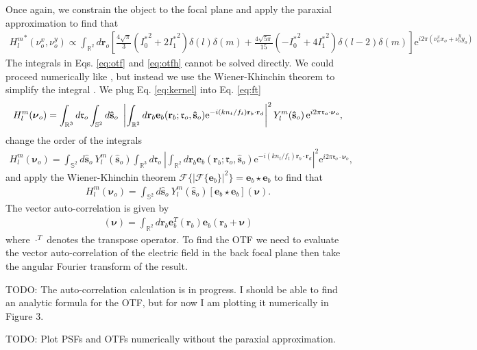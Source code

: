 \documentclass[11pt]{article}
\newcommand{\me}{\mathrm{e}}
\providecommand{\mb}[1]{\mathbf{#1}}
\providecommand{\ro}[1]{\mathbf{\mathfrak{r}}_o}
\providecommand{\so}[1]{\mathbf{\hat{s}}_o}
\providecommand{\rb}[1]{\mathbf{r}_b}
\providecommand{\rd}[1]{\mathbf{r}_d}
\providecommand{\bs}[1]{\boldsymbol{#1}}
\begin{document}
Once again, we constrain the object to the focal plane and apply the paraxial
approximation to find that
\begin{align}
  {H_l^m}^*(\nu_o^x, \nu_o^y) \propto \int_{\mathbb{R}^2}d\mb{r}_o\left[\frac{4\sqrt{\pi}}{3}({I_0^*}^2 + 2{I_1^*}^2)\delta(l)\delta(m) + \frac{4\sqrt{5\pi}}{15}\left(-{I_0^*}^2 + 4{I_1^*}^2\right)\delta(l-2)\delta(m)\right]  \me^{i 2\pi(\nu_o^xx_o + \nu_o^yy_o)}\label{eq:otfh}
\end{align}
The integrals in Eqs. \ref{eq:otf} and \ref{eq:otfh} cannot be solved directly.
We could proceed numerically like \cite{backer2014}, but instead we use the
Wiener-Khinchin theorem to simplify the integral \cite{goodman1996,
  papoulis2002}. We plug Eq. \ref{eq:kernel} into Eq. \ref{eq:ft}
\begin{align}
  H_l^m(\bs{\nu}_o) = \int_{\mathbb{R}^3}d\ro{} \int_{\mathbb{S}^2}d\so{}\ \left|\int_{\mathbb{R}^2} d\rb{} \mb{e}_b(\rb{}; \ro{}, \so{})\me^{-i (kn_t/f_t) \rb{} \cdot \rd{}}\right|^2
 Y_l^m(\so{})\thinspace\me^{i 2\pi \ro{}\cdot\bs{\nu}_o}, \label{eq:ft2}
\end{align}
change the order of the integrals
\begin{align*}
  H_l^m(\bs{\nu}_o) = \int_{\mathbb{S}^2}d\so{}\ Y_l^m(\so{}) \int_{\mathbb{R}^3}d\ro{}\ \left|\int_{\mathbb{R}^2} d\rb{} \mb{e}_b(\rb{}; \ro{}, \so{})\me^{-i (kn_t/f_t) \rb{} \cdot \rd{}}\right|^2 \me^{i 2\pi \ro{}\cdot\bs{\nu}_o}, 
\end{align*}
and apply the Wiener-Khinchin theorem $\mathcal{F}\{|\mathcal{F}\{\mb{e}_b\}|^2\} = \mb{e}_b \star \mb{e}_b$ to find that
\begin{align*}
  H_l^m(\bs{\nu}_o) = \int_{\mathbb{S}^2}d\so{}\ Y_l^m(\so{}) \left[\mb{e}_b \star \mb{e}_b\right](\bs{\nu}). 
\end{align*}
The vector auto-correlation is given by
\begin{align*}
[\mb{e}_b \star \mb{e}_b](\bs{\nu}) = \int_{\mathbb{R}^2}d\bs{r}_b \mb{e}_b^{T}(\bs{r}_b)\mb{e}_b(\bs{r}_b + \bs{\nu})
\end{align*}
where $\cdot^T$ denotes the transpose operator. To find the OTF we need to
evaluate the vector auto-correlation of the electric field in the back focal
plane then take the angular Fourier transform of the result.

TODO: The auto-correlation calculation is in progress. I should be able to find an
analytic formula for the OTF, but for now I am plotting it numerically in Figure 3.

TODO: Plot PSFs and OTFs numerically without the paraxial approximation.
\end{document}
